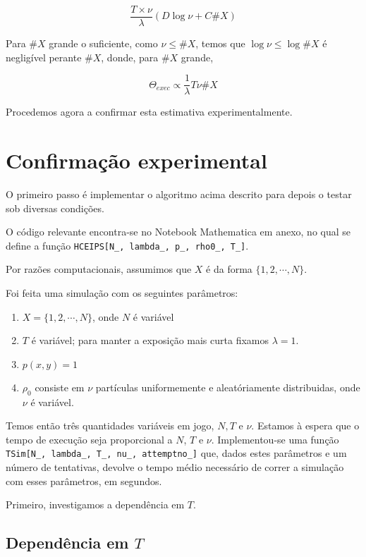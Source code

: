\documentclass{article}
\begin{document}
	\[\frac{T \times \nu}\lambda (D \log \nu + C \#X)\]
	
	Para $\#X$ grande o suficiente, como $\nu \leq \#X$, temos que $\log \nu \leq \log \#X$ é negligível perante $\#X$, donde, para $\#X$ grande,
	
	\[\Theta_{exec} \propto \frac 1 \lambda T \nu \#\!X\]
	
	Procedemos agora a confirmar esta estimativa experimentalmente.
	
	\section{Confirmação experimental}
	
	O primeiro passo é implementar o algoritmo acima descrito para depois o testar sob diversas condições.
	
	O código relevante encontra-se no Notebook Mathematica em anexo, no qual se define a função \texttt{HCEIPS[N\_, lambda\_, p\_, rho0\_, T\_]}.
	
	Por razões computacionais, assumimos que $X$ é da forma $\{1, 2, \cdots, N\}$.
	
	Foi feita uma simulação com os seguintes parâmetros:
	
	\begin{enumerate}
	\item $X = \{1, 2, \cdots, N\}$, onde $N$ é variável
	
	\item $T$ é variável; para manter a exposição mais curta fixamos $\lambda = 1$.
	
	\item $p(x,y) = 1$
	
	\item $\rho_0$ consiste em $\nu$ partículas uniformemente e aleatóriamente distribuidas, onde $\nu$ é variável.
	\end{enumerate}
	
	Temos então três quantidades variáveis em jogo, $N, T$ e $\nu$. Estamos à espera que o tempo de execução seja proporcional a $N$, $T$ e $\nu$. Implementou-se uma função \texttt{TSim[N\_, lambda\_, T\_, nu\_, attemptno\_]} que, dados estes parâmetros e um número de tentativas, devolve o tempo médio necessário de correr a simulação com esses parâmetros, em segundos.
	
	Primeiro, investigamos a dependência em $T$.
	
	\subsection{Dependência em $T$}
	
\end{document}
